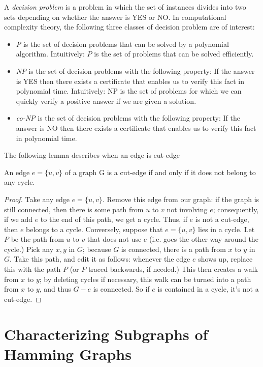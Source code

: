 \documentclass[12pt,a4paper,titlepage,openany]{report}
\begin{document}
A \textit{decision problem} is a problem in which the set of instances divides into two sets depending on whether the answer is YES or NO.
In computational complexity theory, the following three classes of decision problem are of interest:
\begin{itemize}
\item {\it P} is the set of decision problems that can be solved by a polynomial algorithm. Intuitively: $P$ is the set of problems that can be solved efficiently.
\item {\it NP} is the set of decision problems with the following property:
If the answer is YES then there exists a certificate that
enables us to verify this fact in polynomial time. Intuitively: NP is the set of problems for which we can
quickly verify a positive answer if we are given a solution.
\item {\it co-NP} is the set of decision problems with the following property:
If the answer is NO then there exists a certificate that
enables us to verify this fact in polynomial time.
\end{itemize}
The following lemma describes when an edge is cut-edge
\begin{lemma}\label{cutedgecycle}
An edge $e = \{u, v\}$ of a graph G is a cut-edge if and only if it does not belong to any cycle.
\end{lemma}
\begin{proof} Take any edge $e = \{u, v\}$. Remove this edge from our graph: if the graph is still connected, then there is some path from $u$ to $v$ not involving $e$;
consequently, if we add $e$ to the end of this path, we get a cycle. Thus, if $e$ is not a cut-edge, then $e$ belongs to a cycle.\newline
Conversely, suppose that $e = \{u, v\}$ lies in a cycle.
Let $P$ be the path from $u$ to $v$ that does not use $e$ (i.e. goes the other way around the cycle.) Pick any $x, y$ in $G$; because $G$ is connected, there is a path from $x$ to $y$ in $G$. Take this path, and edit it as follows:
whenever the edge $e$ shows up, replace this with the path $P$ (or $P$ traced backwards, if needed.) This then creates a walk from $x$ to $y$; by deleting cycles if necessary, this walk can be turned into a path from $x$ to $y$, and thus $G-e$ is connected. So if $e$ is contained in a cycle, it’s not a cut-edge.
\end{proof}
\chapter{Characterizing Subgraphs of Hamming Graphs}\label{kp-chapter}
\thispagestyle{fancy}
\end{document}

